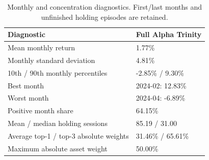 \begin{table}[htbp]
\caption{Monthly and concentration diagnostics. First/last months and unfinished holding episodes are retained.}
\label{tab:monthly}
\begin{tabular}{ll}
\toprule
Diagnostic & Full Alpha Trinity \\
\midrule
Mean monthly return & 1.77\% \\
Monthly standard deviation & 4.81\% \\
10th / 90th monthly percentiles & -2.85\% / 9.30\% \\
Best month & 2024-02: 12.83\% \\
Worst month & 2024-04: -6.89\% \\
Positive month share & 64.15\% \\
Mean / median holding sessions & 85.19 / 31.00 \\
Average top-1 / top-3 absolute weights & 31.46\% / 65.61\% \\
Maximum absolute asset weight & 50.00\% \\
\bottomrule
\end{tabular}
\end{table}
